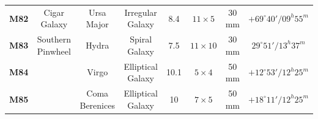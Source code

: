 \documentclass[a4paper,12pt]{extarticle}
\begin{document}
\begin{table}[H]
\begin{tabular}{clcccccc}
\textbf{M82}                             & \multicolumn{1}{c}{Cigar Galaxy}                                                         & Ursa Major                                    & Irregular Galaxy             & 8.4                                                                                           & $11\times5$                                                                                             & 30 mm                                                                                       & $+69^\circ 40'/ 09^h 55^m$                                                                   \\
\rowcolor[HTML]{00FFFF} 
\textbf{M83}                             & \multicolumn{1}{c}{\cellcolor[HTML]{00FFFF}Southern Pinwheel}                            & Hydra                                         & Spiral Galaxy                 & 7.5                                                                                           & $11\times10$                                                                                            & 30 mm                                                                                       & $29^\circ 51'/ 13^h 37^m$                                                                    \\
\rowcolor[HTML]{F3F3F3} 
\textbf{M84}                             &                                                                                          & Virgo                                         & Elliptical Galaxy             & 10.1                                                                                          & $5\times4$                                                                                              & 50 mm                                                                                       & $+12^\circ 53'/ 12^h 25^m$                                                                   \\
\rowcolor[HTML]{F3F3F3} 
\textbf{M85}                             &                                                                                          & Coma Berenices                                & Elliptical Galaxy             & 10                                                                                          & $7\times5$                                                                                              & 50 mm                                                                                       & $+18^\circ 11'/ 12^h 25^m$                                                                   \\

\end{tabular}
\end{table}
\end{document}
